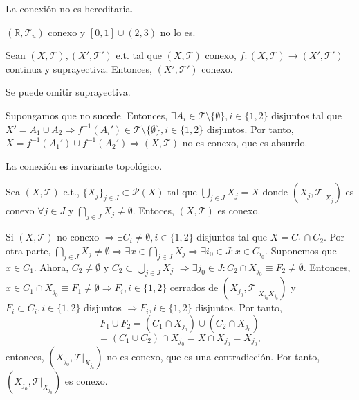 \begin{obs}
  La conexión no es hereditaria.
\end{obs}

\begin{ejm}
  $( \mathbb{R}, \mathcal{T}_{u} )$ conexo y $[ 0, 1 ] \cup (2, 3)$ no lo es.
\end{ejm}

\begin{prop}
  Sean $( X, \mathcal{T} ), ( X', \mathcal{T}' )$ e.t. tal que $( X, \mathcal{T} )$ conexo, $f : ( X, \mathcal{T} ) \to ( X', \mathcal{T}' )$ continua y suprayectiva. Entonces, $( X', \mathcal{T}' )$ conexo.
\end{prop}

\begin{obs}
  Se puede omitir suprayectiva.
\end{obs}

\begin{dem}
  Supongamos que no sucede. Entonces, $\exists A_{i} \in \mathcal{T} \setminus \{  \emptyset \}, i \in \{ 1, 2 \}$ disjuntos tal que $X' = A_{1} \cup A_{2} \Rightarrow f^{-1}(A_{i}') \in \mathcal{T} \setminus \{  \emptyset \}, i \in \{ 1, 2 \}$ disjuntos. Por tanto, $X = f^{-1}(A_{1}') \cup f^{-1}(A_{2}') \Rightarrow ( X, \mathcal{T} )$ no es conexo, que es absurdo.
\end{dem}

\begin{cor}
  La conexión es invariante topológico.
\end{cor}

\begin{prop}
  Sea $( X, \mathcal{T} )$ e.t., $\{ X_{j} \}_{j \in J} \subset \mathcal{P}(X)$ tal que $\bigcup_{j \in J} X_{j} = X$ donde $( X_{j}, \mathcal{T}|_{X_{j}})$ es conexo $\forall j \in J$ y $\bigcap_{j \in J} X_{j} \neq \emptyset$. Entoces, $( X, \mathcal{T} )$ es conexo.
\end{prop}

\begin{dem}
  Si $( X, \mathcal{T} )$ no conexo $\Rightarrow \exists C_{i} \neq \emptyset, i \in \{ 1, 2 \}$ disjuntos tal que $X = C_{1} \cap C_{2}$. Por otra parte, $\bigcap_{j \in J} X_{j} \neq \emptyset \Rightarrow \exists x \in \bigcap_{j \in J} X_{j} \Rightarrow \exists i_{0} \in J : x \in C_{i_{0}}$. Suponemos que $ x \in C_{1}$. Ahora, $C_{2} \neq \emptyset $ y $C_{2} \subset \bigcup_{j \in J} X_{j}$  $\Rightarrow \exists j_{0} \in J : C_{2} \cap X_{j_{0}} \equiv F_{2} \neq \emptyset $. Entonces, $x \in C_{1} \cap X_{j_{0}} \equiv F_{1} \neq \emptyset \Rightarrow F_{i}, i \in \{ 1, 2  \}$ cerrados de $( X_{j_{0}}, \mathcal{T}|_{X_{j_{0}}X_{j_{0}}})$ y $F_{i} \subset C_{i}, i \in \{ 1, 2 \}$ disjuntos $\Rightarrow F_{i}, i \in \{ 1, 2 \}$ disjuntos. Por tanto,
  \[
    F_{1} \cup F_{2} = (C_{1} \cap X_{j_{0}}) \cup (C_{2} \cap X_{j_{0}})
  \]
  \[ 
    = (C_{1} \cup C_{2}) \cap X_{j_{0}} = X \cap X_{j_{0}} = X_{j_{0}},
  \] 
  entonces, $( X_{j_{0}}, \mathcal{T}|_{X_{j_{0}}} )$ no es conexo, que es una contradicción. Por tanto, $( X_{j_{0}}, \mathcal{T}|_{X_{j_{0}}})$ es conexo.
\end{dem}

